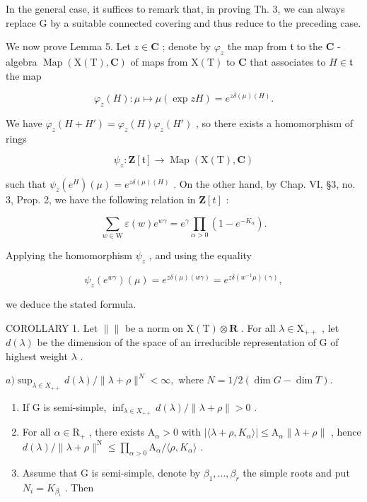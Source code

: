 In the general case, it suffices to remark that, in proving Th. 3, we can always replace G by a suitable connected covering and thus reduce to the preceding case.

We now prove Lemma 5. Let \(z \in \mathbf{C}\) ; denote by \(\varphi_z\) the map from \(\mathfrak{t}\) to the \(\mathbf{C}\) -algebra \(\operatorname{Map}(\mathrm{X}(\mathrm{T}), \mathbf{C})\) of maps from \(\mathrm{X}(\mathrm{T})\) to \(\mathbf{C}\) that associates to \(H \in \mathfrak{t}\) the map

\[
\varphi_ {z} (H): \mu \mapsto \mu (\exp z H) = e ^ {z \delta (\mu) (H)}.
\]

We have \(\varphi_z(H + H') = \varphi_z(H)\varphi_z(H')\) , so there exists a homomorphism of rings

\[
\psi_ {z}: \mathbf {Z} [ \mathfrak {t} ] \to \operatorname{Map} (\mathrm{X} (\mathrm{T}), \mathbf {C})
\]

such that \(\psi_z(e^H)(\mu) = e^{z\delta (\mu)(H)}\) . On the other hand, by Chap. VI, §3, no. 3, Prop. 2, we have the following relation in \(\mathbf{Z}[t]\) :

\[
\sum_ {w \in \mathrm{W}} \varepsilon (w) e ^ {w \gamma} = e ^ {\gamma} \prod_ {\alpha > 0} (1 - e ^ {- K _ {\alpha}}).
\]

Applying the homomorphism \(\psi_z\) , and using the equality

\[
\psi_ {z} (e ^ {w \gamma}) (\mu) = e ^ {z \delta (\mu) (w \gamma)} = e ^ {z \delta (w ^ {- 1} \mu) (\gamma)},
\]

we deduce the stated formula.

COROLLARY 1. Let \(\| \|\) be a norm on \(\mathrm{X(T)}\otimes \mathbf{R}\) . For all \(\lambda \in \mathrm{X}_{++}\) , let \(d(\lambda)\) be the dimension of the space of an irreducible representation of \(\mathrm{G}\) of highest weight \(\lambda\) .

\(a) \sup_{\lambda \in X_{++}} d(\lambda) / \| \lambda + \rho \|^{N} < \infty, \text{ where } N = 1/2 (\dim G - \dim T).\)

\begin{enumerate}
\def\labelenumi{\alph{enumi})}
\setcounter{enumi}{1}
\item
  If G is semi-simple, \(\inf_{\lambda\in X_{++}}d(\lambda)/\|\lambda+\rho\|>0\) .
\item
  For all \(\alpha \in \mathrm{R}_{+}\) , there exists \(\mathrm{A}_{\alpha} > 0\) with \(|\langle \lambda + \rho, K_{\alpha} \rangle| \leq \mathrm{A}_{\alpha} \| \lambda + \rho \|\) , hence \(d(\lambda) / \| \lambda + \rho \|^{\mathrm{N}} \leq \prod_{\alpha > 0} \mathrm{A}_{\alpha} / \langle \rho, K_{\alpha} \rangle\) .
\item
  Assume that G is semi-simple, denote by \(\beta_{1},\ldots,\beta_{r}\) the simple roots and put \(N_{i}=K_{\beta_{i}}\) . Then
\end{enumerate}

